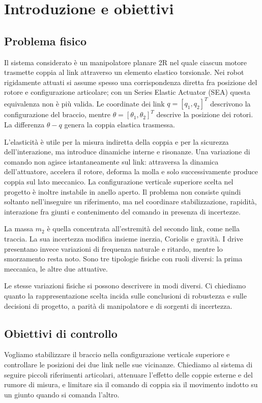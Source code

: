 \chapter{Introduzione e obiettivi}

\section{Problema fisico}
Il sistema considerato è un manipolatore planare 2R nel quale ciascun motore trasmette coppia al link attraverso un elemento elastico torsionale. Nei robot rigidamente attuati si assume spesso una corrispondenza diretta fra posizione del rotore e configurazione articolare; con un Series Elastic Actuator (SEA) questa equivalenza non è più valida. Le coordinate dei link $q=[q_1,q_2]^T$ descrivono la configurazione del braccio, mentre $\theta=[\theta_1,\theta_2]^T$ descrive la posizione dei rotori. La differenza $\theta-q$ genera la coppia elastica trasmessa.

L'elasticità è utile per la misura indiretta della coppia e per la sicurezza dell'interazione, ma introduce dinamiche interne e risonanze. Una variazione di comando non agisce istantaneamente sul link: attraversa la dinamica dell'attuatore, accelera il rotore, deforma la molla e solo successivamente produce coppia sul lato meccanico. La configurazione verticale superiore scelta nel progetto è inoltre instabile in anello aperto. Il problema non consiste quindi soltanto nell'inseguire un riferimento, ma nel coordinare stabilizzazione, rapidità, interazione fra giunti e contenimento del comando in presenza di incertezze.

La massa $m_2$ è quella concentrata all'estremità del secondo link, come nella traccia. La sua incertezza modifica insieme inerzia, Coriolis e gravità. I drive presentano invece variazioni di frequenza naturale e ritardo, mentre lo smorzamento resta noto. Sono tre tipologie fisiche con ruoli diversi: la prima meccanica, le altre due attuative.

Le stesse variazioni fisiche si possono descrivere in modi diversi.
Ci chiediamo quanto la rappresentazione scelta incida sulle conclusioni
di robustezza e sulle decisioni di progetto, a parità di manipolatore e
di sorgenti di incertezza.

\section{Obiettivi di controllo}
Vogliamo stabilizzare il braccio nella configurazione verticale
superiore e controllare le posizioni dei due link nelle sue vicinanze.
Chiediamo al sistema di seguire piccoli riferimenti articolari, attenuare
l'effetto delle coppie esterne e del rumore di misura, e limitare sia il
comando di coppia sia il movimento indotto su un giunto quando si comanda
l'altro.

